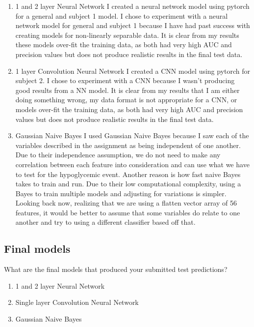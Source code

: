 \documentclass[11pt,a4paper]{article}
\begin{document}
\begin{enumerate}
	\item 1 and 2 layer Neural Network
		\subitem
		I created a neural network model using pytorch for a general and subject 1 model.
		I chose to experiment with a neural network model for general and subject 1 because I have had past success with creating models for non-linearly separable data.
		It is clear from my results these models over-fit the training data, as both had very high AUC and precision values but does not produce realistic results in the final test data.

	\item 1 layer Convolution Neural Network
		\subitem
		I created a CNN model using pytorch for subject 2.
		I chose to experiment with a CNN because I wasn't producing good results from a NN model.
		It is clear from my results that I am either doing something wrong, my data format is not appropriate for a CNN, or models over-fit the training data, as both had very high AUC and precision values but does not produce realistic results in the final test data.
		
	\item Gaussian Naive Bayes
	    \subitem
	    I used Gaussian Naive Bayes because I saw each of the variables described in the assignment as being independent of one another.
	    Due to their independence assumption, we do not need to make any correlation between each feature into consideration and can use what we have to test for the hypoglycemic event.
	    Another reason is how fast naive Bayes takes to train and run.
	    Due to their low computational complexity, using a Bayes to train multiple models and adjusting for variations is simpler.
	    Looking back now, realizing that we are using a flatten vector array of 56 features, it would be better to assume that some variables do relate to one another and try to using a different classifier based off that.
\end{enumerate}


\subsection{Final models}
What are the final models that produced your submitted test predictions?
\begin{enumerate}
	\item 1 and 2 layer Neural Network
	\item Single layer Convolution Neural Network
	\item Gaussian Naive Bayes
\end{enumerate}
\end{document}
